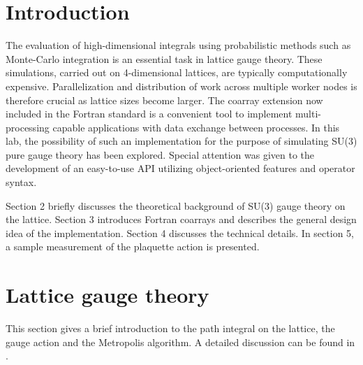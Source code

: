 \documentclass[graybox]{svmult}
\begin{document}
%
%
\maketitle




\section{Introduction} \label{sect:introduction}
The evaluation of high-dimensional integrals using probabilistic methods such as Monte-Carlo integration is an essential task in lattice gauge theory. These simulations, carried out on 4-dimensional lattices, are typically computationally expensive. Parallelization and distribution of work across multiple worker nodes is therefore crucial as lattice sizes become larger. The coarray extension now included in the Fortran standard is a convenient tool to implement multi-processing capable applications with data exchange between processes. In this lab, the possibility of such an implementation for the purpose of simulating SU(3) pure gauge theory has been explored. Special attention was given to the development of an easy-to-use API utilizing object-oriented features and operator syntax.

Section 2 briefly discusses the theoretical background of SU(3) gauge theory on the lattice. Section 3 introduces Fortran coarrays and describes the general design idea of the implementation. Section 4 discusses the technical details. In section 5, a sample measurement of the plaquette action is presented.

\section{Lattice gauge theory}

This section gives a brief introduction to the path integral on the lattice, the gauge action and the Metropolis algorithm. A detailed discussion can be found in \cite{gattringer}.
\end{document}
